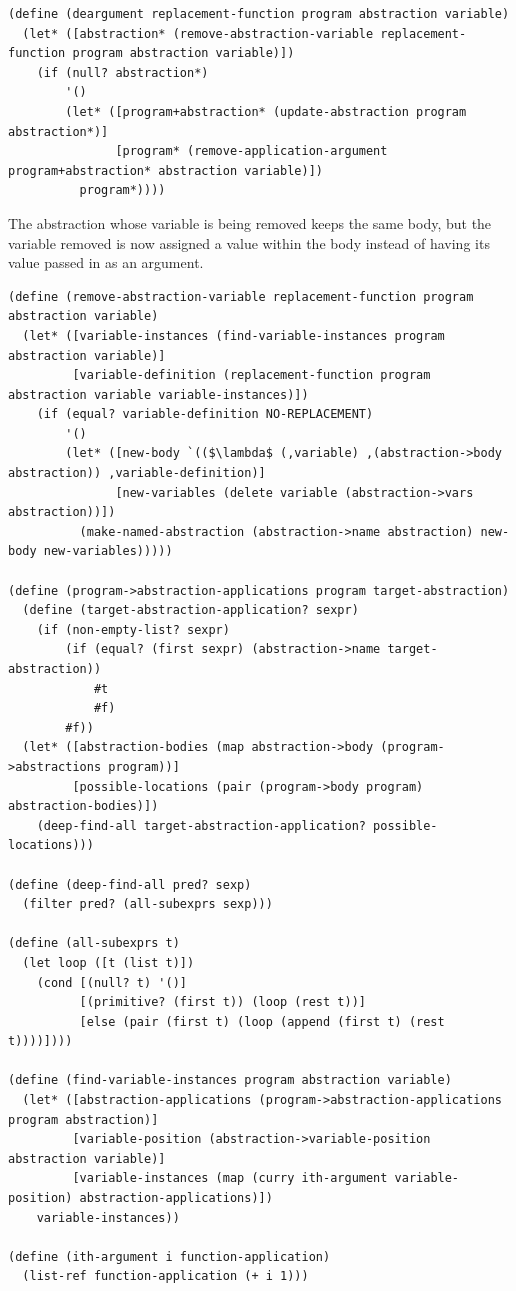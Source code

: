 \documentclass[a4paper,10pt]{article}
\begin{document}
\begin{lstlisting}[frame=trbl]
(define (deargument replacement-function program abstraction variable)
  (let* ([abstraction* (remove-abstraction-variable replacement-function program abstraction variable)])
    (if (null? abstraction*)
        '()
        (let* ([program+abstraction* (update-abstraction program abstraction*)]
               [program* (remove-application-argument program+abstraction* abstraction variable)])
          program*))))
\end{lstlisting}
The abstraction whose variable is being removed keeps the same body, but the variable removed is now assigned a value within the body instead of having its value passed in as an argument.
\begin{lstlisting}[frame=trbl]
(define (remove-abstraction-variable replacement-function program abstraction variable)
  (let* ([variable-instances (find-variable-instances program abstraction variable)]
         [variable-definition (replacement-function program abstraction variable variable-instances)])
    (if (equal? variable-definition NO-REPLACEMENT)
        '()
        (let* ([new-body `(($\lambda$ (,variable) ,(abstraction->body abstraction)) ,variable-definition)]
               [new-variables (delete variable (abstraction->vars abstraction))])
          (make-named-abstraction (abstraction->name abstraction) new-body new-variables)))))

(define (program->abstraction-applications program target-abstraction)
  (define (target-abstraction-application? sexpr)
    (if (non-empty-list? sexpr)
        (if (equal? (first sexpr) (abstraction->name target-abstraction))
            #t
            #f)
        #f))
  (let* ([abstraction-bodies (map abstraction->body (program->abstractions program))]
         [possible-locations (pair (program->body program) abstraction-bodies)])
    (deep-find-all target-abstraction-application? possible-locations)))

(define (deep-find-all pred? sexp)
  (filter pred? (all-subexprs sexp)))

(define (all-subexprs t)
  (let loop ([t (list t)])
    (cond [(null? t) '()]
          [(primitive? (first t)) (loop (rest t))]
          [else (pair (first t) (loop (append (first t) (rest t))))])))

(define (find-variable-instances program abstraction variable)
  (let* ([abstraction-applications (program->abstraction-applications program abstraction)]
         [variable-position (abstraction->variable-position abstraction variable)]
         [variable-instances (map (curry ith-argument variable-position) abstraction-applications)])
    variable-instances))

(define (ith-argument i function-application)
  (list-ref function-application (+ i 1)))
\end{lstlisting}
\end{document}
